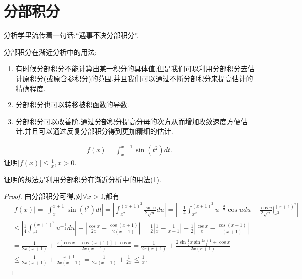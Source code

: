 \documentclass[lang=cn,newtx,10pt,scheme=chinese]{elegantbook}
\begin{document}
\section{分部积分}

分析学里流传着一句话:“遇事不决分部积分”.

分部积分在渐近分析中的用法:
\begin{enumerate}[(1)]
\item\label{分部积分在渐近分析中的用法(1)} 有时候分部积分不能计算出某一积分的具体值,但是我们可以利用分部积分去估计原积分(或原含参积分)的范围.并且我们可以通过不断分部积分来提高估计的精确程度.

\item\label{分部积分在渐近分析中的用法(2)} 分部积分也可以转移被积函数的导数.

\item\label{分部积分在渐近分析中的用法(3)} 分部积分可以改善阶.通过分部积分提高分母的次方从而增加收敛速度方便估计.并且可以通过反复分部积分得到更加精细的估计.
\end{enumerate}

\begin{example}
\begin{align*}
f\left( x \right) =\int_x^{x+1}{\sin \left( t^2 \right) dt}.
\end{align*}
证明$\left| f\left( x \right) \right|\le \frac{1}{x},x>0$.
\end{example}
\begin{note}
证明的想法是利用\hyperref[分部积分在渐近分析中的用法(1)]{分部积分在渐近分析中的用法(1)}.
\end{note}
\begin{proof}
由分部积分可得,对$\forall x>0$,都有
\begin{align*}
&\left| f\left( x \right) \right|=\left| \int_x^{x+1}{\sin \left( t^2 \right) dt} \right|=\left| \int_{x^2}^{\left( x+1 \right) ^2}{\frac{\sin u}{2\sqrt{u}}du} \right|=\left| -\frac{1}{4}\int_{x^2}^{\left( x+1 \right) ^2}{u^{-\frac{3}{2}}\cos udu}-\frac{\cos u}{2\sqrt{u}}\Big|_{x^2}^{\left( x+1 \right) ^2} \right|
\\
&\leqslant \left| \frac{1}{4}\int_{x^2}^{\left( x+1 \right) ^2}{u^{-\frac{3}{2}}du} \right|+\left| \frac{\cos x}{2x}-\frac{\cos \left( x+1 \right)}{2\left( x+1 \right)} \right|=\frac{1}{2}\left| \frac{1}{x}-\frac{1}{x+1} \right|+\frac{1}{2}\left| \frac{\cos x}{x}-\frac{\cos \left( x+1 \right)}{\left( x+1 \right)} \right|
\\
&=\frac{1}{2x\left( x+1 \right)}+\frac{x\left[ \cos x-\cos \left( x+1 \right) \right] +\cos x}{2x\left( x+1 \right)}=\frac{1}{2x\left( x+1 \right)}+\frac{2\sin \frac{1}{2}x\sin \frac{2x+1}{2}+\cos x}{2x\left( x+1 \right)}
\\
&\le \frac{1}{2x\left( x+1 \right)}+\frac{x+1}{2x\left( x+1 \right)}=\frac{1}{2x\left( x+1 \right)}+\frac{1}{2x}\leqslant \frac{1}{x}.
\end{align*}
\end{proof}
\end{document}
